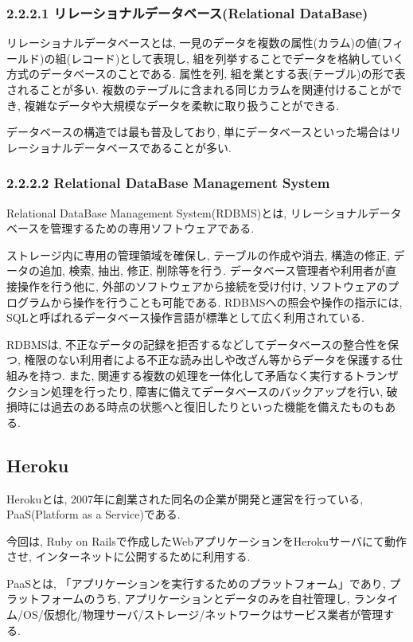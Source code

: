 \subsubsection{2.2.2.1 リレーショナルデータベース(Relational DataBase)}
リレーショナルデータベースとは, 一見のデータを複数の属性(カラム)の値(フィールド)の組(レコード)として表現し, 組を列挙することでデータを格納していく方式のデータベースのことである.
属性を列, 組を業とする表(テーブル)の形で表されることが多い.
複数のテーブルに含まれる同じカラムを関連付けることができ, 複雑なデータや大規模なデータを柔軟に取り扱うことができる.

データベースの構造では最も普及しており, 単にデータベースといった場合はリレーショナルデータベースであることが多い.

\subsubsection{2.2.2.2 Relational DataBase Management System}
Relational DataBase Management System(RDBMS)とは, リレーショナルデータベースを管理するための専用ソフトウェアである.

ストレージ内に専用の管理領域を確保し, テーブルの作成や消去, 構造の修正, データの追加, 検索, 抽出, 修正, 削除等を行う.
データベース管理者や利用者が直接操作を行う他に, 外部のソフトウェアから接続を受け付け, ソフトウェアのプログラムから操作を行うことも可能である.
RDBMSへの照会や操作の指示には, SQLと呼ばれるデータベース操作言語が標準として広く利用されている.

RDBMSは, 不正なデータの記録を拒否するなどしてデータベースの整合性を保つ, 権限のない利用者による不正な読み出しや改ざん等からデータを保護する仕組みを持つ.
また, 関連する複数の処理を一体化して矛盾なく実行するトランザクション処理を行ったり, 障害に備えてデータベースのバックアップを行い, 破損時には過去のある時点の状態へと復旧したりといった機能を備えたものもある.

\subsection{Heroku}
Herokuとは, 2007年に創業された同名の企業が開発と運営を行っている, PaaS(Platform as a Service)である.

今回は, Ruby on Railsで作成したWebアプリケーションをHerokuサーバにて動作させ, インターネットに公開するために利用する.

PaaSとは, 「アプリケーションを実行するためのプラットフォーム」であり, プラットフォームのうち, アプリケーションとデータのみを自社管理し, ランタイム/OS/仮想化/物理サーバ/ストレージ/ネットワークはサービス業者が管理する.

